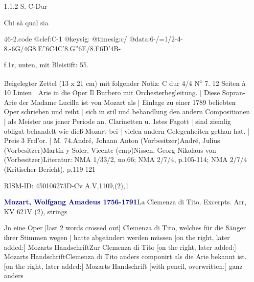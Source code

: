 \documentclass[a4paper, twocolumn, 11pt]{book}
\begin{document}
\newline %
\par 1.1.2  S, C-Dur\newline \begin{footnotesize} Chi sà qual sia \end{footnotesize}  
\begin{filecontents*}{46-2.code}
@clef:C-1
@keysig:
@timesig:c/
@data:6-/=1/2-4-8.-6G/4G8.E''6C4C'8.G''6E/{8.F6D}'4B-
\end{filecontents*}

\newline %
\par f.1r, unten, mit Bleistift: {\textquotedbl}55.{\textquotedbl}
\par Beigelegter Zettel (13 x 21 cm) mit folgender Notiz: C dur 4/4 N\textsuperscript{o} 7. 12 Seiten à 10 Linien | Arie in die Oper Il Burbero mit Orchesterbegleitung. | Diese Sopran-Arie der Madame Lucilla ist von Mozart als | Einlage zu einer 1789 beliebten Oper schrieben und reiht | sich in stil und behandlung den andern Compositionen | als Meister aus jener Periode an. Clarinetten u. 1stes Fagott | sind ziemlig obligat behandelt wie dieß Mozart bei | vielen andern Gelegenheiten gethan hat. | Preis 3 Frd'or. | M. 74.\newline André, Johann Anton  (Vorbesitzer)\newline André, Julius  (Vorbesitzer)\newline Martín y Soler, Vicente  (cmp)\newline Nissen, Georg Nikolaus von  (Vorbesitzer)\newline Literatur: NMA  1/33/2, no.66; NMA  2/7/4, p.105-114; NMA  2/7/4 (Kritischer Bericht), p.119-121
\par RISM-ID: 450106273\newline D-Cv  A.V,1109,(2),1
\par \vspace{16pt} \textcolor{darkblue}{\textbf{Mozart, Wolfgang Amadeus  1756-1791}}\hfillplus{[47]}\newline La Clemenza di Tito. Excerpts. Arr, KV 621\newline V (2), strings
\par \begin{itshape} Jn eine Oper [last 2 words crossed out] Clemenza di Tito, welches für die Sänger ihrer Stimmen wegen | hatte abgeändert werden müssen [on the right, later added:] Mozarts Handschrift Zur Clemenza di Tito [on the right, later added:] Mozarts Handschrift Clemenza di Tito anders componirt als die Arie bekannt ist.  [on the right, later added:] Mozarts Handschrift [with pencil, overwritten:] ganz anders\end{itshape} 
\end{document}
